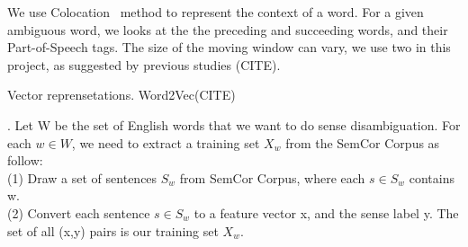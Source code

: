 We use Colocation~\cite{colocation} method to represent the context of a word.
For a given ambiguous word, we looks at the the preceding and succeeding words,
and their Part-of-Speech tags.
The size of the moving window can vary, we use two in this project, as suggested
by previous studies (CITE).
\begin{equation}
  [w_{i-2},POS_{i-2},w_{i-1},POS_{i-1},w_{i+1},POS_{i+1},w_{i+1},POS_{i+1}]
\end{equation}

Vector reprensetations.
Word2Vec(CITE)

.
Let W be the set of English words that we want to do sense disambiguation. For
each $w \in W$, we need to extract a training set $X_w$ from the SemCor Corpus
as follow: \\
  (1) Draw a set of sentences $S_w$ from SemCor Corpus, where each 
$s \in S_w$ contains w. \\
  (2) Convert each sentence $s \in S_w$ to a feature vector x, and the sense
    label y. The set of all (x,y) pairs is our training set $X_w$.


